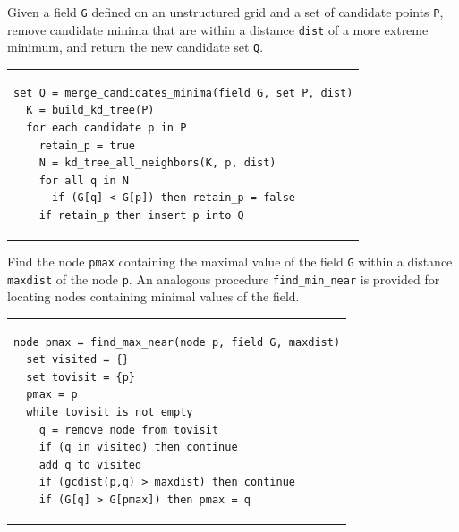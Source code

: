 \documentclass[gmdd, hvmath]{copernicus}
\begin{document}
\begin{algorithm}
\caption{Given a field \texttt{G} defined on an unstructured grid and a set of candidate points \texttt{P}, remove candidate minima that are within a distance \texttt{dist} of a more extreme minimum, and return the new candidate set \texttt{Q}.\ \\} \label{alg:merge_candidates_minima}
\noindent \begin{tabular}{p{5in}}
\small \begin{verbatim}
set Q = merge_candidates_minima(field G, set P, dist)
  K = build_kd_tree(P)
  for each candidate p in P
    retain_p = true
    N = kd_tree_all_neighbors(K, p, dist)
    for all q in N
      if (G[q] < G[p]) then retain_p = false
    if retain_p then insert p into Q
\end{verbatim} \\
\end{tabular}
\end{algorithm}

\begin{algorithm}
\caption{Find the node \texttt{pmax} containing the maximal value of the field \texttt{G} within a distance \texttt{maxdist} of the node \texttt{p}.  An analogous procedure \texttt{find\_min\_near} is provided for locating nodes containing minimal values of the field.\ \\} \label{alg:find_max_near}
\noindent \begin{tabular}{p{5in}}
\small \begin{verbatim}
node pmax = find_max_near(node p, field G, maxdist)
  set visited = {}
  set tovisit = {p}
  pmax = p
  while tovisit is not empty
    q = remove node from tovisit
    if (q in visited) then continue
    add q to visited
    if (gcdist(p,q) > maxdist) then continue
    if (G[q] > G[pmax]) then pmax = q
\end{verbatim} \\
\end{tabular}
\end{algorithm}
\end{document}
